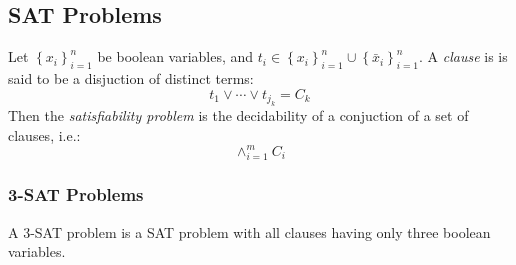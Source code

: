 \subsection{SAT Problems}

\begin{prob}\label{prob:ncpi-6}%
Let $\left\lbrace x_i \right\rbrace_{i=1}^{n} $ be boolean variables, and $t_i \in \left\lbrace x_i\right\rbrace_{i=1}^{n}  \cup \left\lbrace \bar{x}_i\right\rbrace_{i=1}^{n}   $.  A \textit{clause} is is said to be a disjuction of distinct terms:
$$
t_1 \vee \cdots \vee t_{j_k} = C_k
$$
Then the \textit{satisfiability problem} is the decidability of a conjuction of a set of clauses, i.e.:
$$ \wedge_{i=1}^m C_i$$
\end{prob} \cite{skiena2009algorithm}

\subsubsection{3-SAT Problems}
A 3-SAT problem is a SAT problem with all clauses having only three boolean variables. 